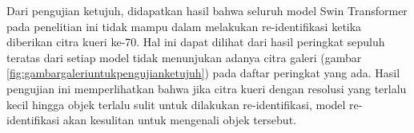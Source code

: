 Dari pengujian ketujuh, didapatkan hasil bahwa seluruh model Swin Transformer pada penelitian ini tidak mampu dalam melakukan 
re-identifikasi ketika diberikan citra kueri ke-70. Hal ini dapat dilihat dari hasil peringkat sepuluh teratas dari setiap 
model tidak menunjukan adanya citra galeri (gambar \ref{fig:gambargaleriuntukpengujianketujuh}) pada daftar peringkat yang 
ada. Hasil pengujian ini memperlihatkan bahwa jika citra kueri dengan resolusi yang terlalu kecil hingga objek terlalu sulit 
untuk dilakukan re-identifikasi, model re-identifikasi akan kesulitan untuk mengenali objek tersebut.







